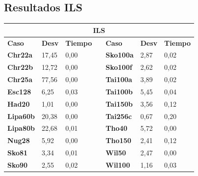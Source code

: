 \documentclass[a4paper, 12pt]{article}
\begin{document}
      \subsection{Resultados ILS}
      \begin{table}[H]
\centering
\begin{tabular}{|l|l|l|l|l|l|l|}
\hline
\multicolumn{7}{|c|}{\textbf{ILS}}                                                                                  \\ \hline
\textbf{Caso}    & \textbf{Desv} & \textbf{Tiempo} & \textbf{} & \textbf{Caso}    & \textbf{Desv} & \textbf{Tiempo} \\ \cline{1-3} \cline{5-7} 
\textbf{Chr22a}  & 17,45         & 0,00            &           & \textbf{Sko100a} & 2,87          & 0,02            \\ \cline{1-3} \cline{5-7} 
\textbf{Chr22b}  & 12,72         & 0,00            &           & \textbf{Sko100f} & 2,62          & 0,02            \\ \cline{1-3} \cline{5-7} 
\textbf{Chr25a}  & 77,56         & 0,00            &           & \textbf{Tai100a} & 3,89          & 0,02            \\ \cline{1-3} \cline{5-7} 
\textbf{Esc128}  & 6,25          & 0,03            &           & \textbf{Tai100b} & 5,45          & 0,04            \\ \cline{1-3} \cline{5-7} 
\textbf{Had20}   & 1,01          & 0,00            &           & \textbf{Tai150b} & 3,56          & 0,12            \\ \cline{1-3} \cline{5-7} 
\textbf{Lipa60b} & 20,38         & 0,00            &           & \textbf{Tai256c} & 0,67          & 0,20            \\ \cline{1-3} \cline{5-7} 
\textbf{Lipa80b} & 22,68         & 0,01            &           & \textbf{Tho40}   & 5,72          & 0,00            \\ \cline{1-3} \cline{5-7} 
\textbf{Nug28}   & 5,92          & 0,00            &           & \textbf{Tho150}  & 2,41          & 0,12            \\ \cline{1-3} \cline{5-7} 
\textbf{Sko81}   & 3,34          & 0,01            &           & \textbf{Wil50}   & 2,47          & 0,00            \\ \cline{1-3} \cline{5-7} 
\textbf{Sko90}   & 2,55          & 0,02            &           & \textbf{Wil100}  & 1,16          & 0,03            \\ \cline{1-3} \cline{5-7} 
\end{tabular}
\end{table}
\end{document}
